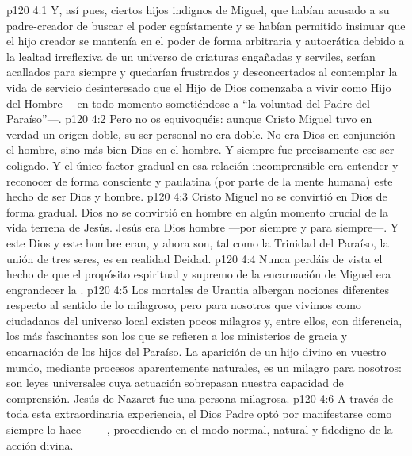 \vs p120 4:1 Y, así pues, ciertos hijos indignos de Miguel, que habían acusado a su padre\hyp{}creador de buscar el poder egoístamente y se habían permitido insinuar que el hijo creador se mantenía en el poder de forma arbitraria y autocrática debido a la lealtad irreflexiva de un universo de criaturas engañadas y serviles, serían acallados para siempre y quedarían frustrados y desconcertados al contemplar la vida de servicio desinteresado que el Hijo de Dios comenzaba a vivir como Hijo del Hombre ---en todo momento sometiéndose a “la voluntad del Padre del Paraíso”---.
\vs p120 4:2 \pc Pero no os equivoquéis: aunque Cristo Miguel tuvo en verdad un origen doble, su ser personal no era doble. No era Dios en conjunción  el hombre, sino más bien Dios  en el hombre. Y siempre fue precisamente ese ser coligado. Y el único factor gradual en esa relación incomprensible era entender y reconocer de forma consciente y paulatina (por parte de la mente humana) este hecho de ser Dios y hombre.
\vs p120 4:3 Cristo Miguel no se convirtió en Dios de forma gradual. Dios no se convirtió en hombre en algún momento crucial de la vida terrena de Jesús. Jesús era Dios  hombre ---por siempre y para siempre---. Y este Dios y este hombre eran, y ahora son,  tal como la Trinidad del Paraíso, la unión de tres seres, es en realidad  Deidad.
\vs p120 4:4 Nunca perdáis de vista el hecho de que el propósito espiritual y supremo de la encarnación de Miguel era engrandecer la .
\vs p120 4:5 \pc Los mortales de Urantia albergan nociones diferentes respecto al sentido de lo milagroso, pero para nosotros que vivimos como ciudadanos del universo local existen pocos milagros y, entre ellos, con diferencia, los más fascinantes son los que se refieren a los ministerios de gracia y encarnación de los hijos del Paraíso. La aparición de un hijo divino en vuestro mundo, mediante procesos aparentemente naturales, es un milagro para nosotros: son leyes universales cuya actuación sobrepasan nuestra capacidad de comprensión. Jesús de Nazaret fue una persona milagrosa.
\vs p120 4:6 A través de toda esta extraordinaria experiencia, el Dios Padre optó por manifestarse como siempre lo hace ------, procediendo en el modo normal, natural y fidedigno de la acción divina.
